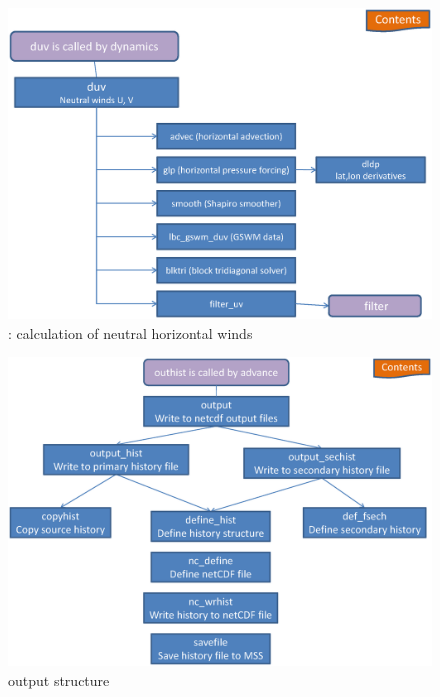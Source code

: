 %
\begin{figure}
  \centering
  \includegraphics[scale=0.7,angle=-90.]{./tex_plot/code_12.ps}
  \caption{: calculation of neutral horizontal winds}
   \label{fig:code_12}
\end{figure}
%
\begin{figure}
  \centering
  \includegraphics[scale=0.7,angle=-90.]{./tex_plot/code_13.ps}
  \caption{output structure}
   \label{fig:code_13}
\end{figure}
%

